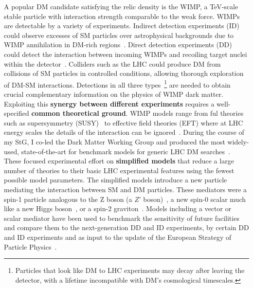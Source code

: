 A popular DM candidate satisfying the relic density is the WIMP, a TeV-scale stable particle with interaction strength comparable to the weak force.  
WIMPs are detectable by a variety of experiments. 
Indirect detection experiments (ID) could observe excesses of SM particles over astrophysical backgrounds due to WIMP annihilation in DM-rich regions~\cite{Gaskins:2016cha}. 
Direct detection experiments (DD) could detect the interaction between incoming WIMPs and recoiling target nuclei within the detector~\cite{Schumann:2019eaa}. 
Colliders such as the LHC could produce DM from collisions of SM particles in controlled conditions, allowing thorough exploration of DM-SM interactions. 
Detections in all three types~\footnote{Particles that look like DM to LHC experiments may decay after leaving the detector, with a lifetime incompatible with DM’s cosmological timescales.} are needed to obtain crucial complementary information on the physics of WIMP dark matter. 
\\
Exploiting this \textbf{synergy between different experiments} requires a well-specified \textbf{common theoretical ground}. 
WIMP models range from ful theories such as supersymmetry (SUSY)~\cite{Martin:1997ns} to effective field theories (EFT) where at LHC energy scales the details of the interaction can be ignored~\cite{Goodman:2010ku}. 
During the course of my StG, I co-led the Dark Matter Working Group and produced the most widely-used, state-of-the-art for benchmark models for generic LHC DM searches~\cite{Abercrombie:2015wmb}. 
These focused experimental effort on \textbf{simplified models} that reduce a large number of theories to their basic LHC experimental features using the fewest possible model parameters. 
The simplified models introduce a new particle mediating the interaction between SM and DM particles. 
These mediators were a spin-1 particle analogous to the Z boson (a $Z’$ boson)~\cite{Shoemaker:2011vi,Buchmueller:2013dya,Chala:2015ama}, a new spin-0 scalar much like a new Higgs boson~\cite{Buckley:2014fba,Egana-Ugrinovic:2019dqu,Abe:2018bpo}, or a spin-2 graviton~\cite{Kang:2020huh}. 
Models including a vector or scalar mediator have been used to benchmark the sensitivity of future facilities and compare them to the next-generation DD and ID experiments, by certain DD and ID experiments and as input to the update of the European Strategy of Particle Physics~\cite{Strategy:2019vxc}.
